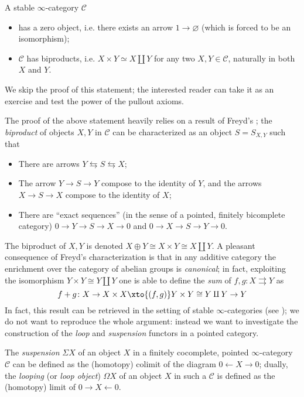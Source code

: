 \documentclass[11pt, a4paper]{amsart}
\renewcommand{\C}{\mathcal{C}}
\begin{document}
\begin{remark}
A stable $\infty$-category $\C$
\begin{itemize}
\item has a zero object, i.e. there exists an arrow $1\to\varnothing$ (which is forced to be an isomorphism);
\item $\C$ has biproducts, i.e. $X\times Y\simeq X\amalg Y$ for any two $X,Y\in\C$, naturally in both $X$ and $Y$. 
\end{itemize}
\end{remark}
We skip the proof of this statement; the interested reader can take it as an exercise and test the power of the pullout axioms.
\begin{remark}
The proof of the above statement heavily relies on a result of Freyd's \cite{freyd1964abelian}; the \emph{biproduct} of objects $X,Y$ in $\C$ can be characterized as an object $S = S_{X,Y}$ such that
\begin{itemize}
\item There are arrows $Y\leftrightarrows S\leftrightarrows X$;
\item The arrow $Y\to S\to Y$ compose to the identity of $Y$, and the arrows $X\to S\to X$ compose to the identity of $X$;
\item There are ``exact sequences'' (in the sense of a pointed, finitely bicomplete category) $0\to Y\to S\to X\to 0$ and $0\to X\to S\to Y\to 0$.
\end{itemize}
The biproduct of $X,Y$ is denoted $X\oplus Y\cong X\times Y\cong X\amalg Y$. A pleasant consequence of Freyd's characterization is that in any additive category the enrichment over the category of abelian groups is \emph{canonical}; in fact, exploiting the isomorphism $Y\times Y\cong Y\amalg Y$ one is able to define the \emph{sum} of $f,g\colon X\rightrightarrows Y$ as
\[
f+g\colon X\to X\times X \xto{(f,g)} Y\times Y\cong Y\amalg Y\to Y
\]
In fact, this result can be retrieved in the setting of stable $\infty$-categories (see \cite[Lemma \textbf{1.1.2.9}]{LurieHA}); we do not want to reproduce the whole argument: instead we want to investigate the construction of the \emph{loop} and \emph{suspension} functors in a pointed category.
\end{remark}
The \emph{suspension} $\Sigma X$ of an object $X$ in a finitely cocomplete, pointed $\infty$-category $\C$ can be defined as the (homotopy) colimit of the diagram $0\leftarrow X\to 0$; dually, the \emph{looping} (or \emph{loop object}) $\Omega X$ of an object $X$ in such a $\C$ is defined as the (homotopy) limit of $0\to X\leftarrow 0$. 
\end{document}
